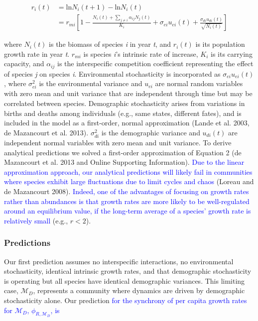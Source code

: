 \documentclass[12pt,]{article}
\begin{document}
\begin{align}
r_i(t) &= \text{ln}N_i(t+1) - \text{ln}N_i(t) \\
&= r_{mi} \left[ 1- \frac{N_i(t)+\sum_{j \neq i} \alpha_{ij}N_j(t)} {K_i} + \sigma_{ei}u_{ei}(t) + \frac{\sigma_{di}u_{di}(t)}{\sqrt{N_i(t)}} \right]
\end{align}

\noindent where \(N_i(t)\) is the biomass of species \emph{i} in year
\emph{t}, and \(r_i(t)\) is its population growth rate in year \emph{t}.
\(r_{mi}\) is species \emph{i}'s intrinsic rate of increase, \(K_i\) is
its carrying capacity, and \(\alpha_{ij}\) is the interspecific
competition coefficient representing the effect of species \emph{j} on
species \emph{i}. Environmental stochasticity is incorporated as
\(\sigma_{ei}u_{ei}(t)\), where \(\sigma_{ei}^2\) is the environmental
variance and \(u_{ei}\) are normal random variables with zero mean and
unit variance that are independent through time but may be correlated
between species. Demographic stochasticity arises from variations in
births and deaths among individuals (e.g., same states, different
fates), and is included in the model as a first-order, normal
approximation (Lande et al. 2003, {{de Mazancourt}} et al. 2013).
\(\sigma_{di}^2\) is the demographic variance and \(u_{di}(t)\) are
independent normal variables with zero mean and unit variance. To derive
analytical predictions we solved a first-order approximation of Equation
2 ({{de Mazancourt}} et al. 2013 and Online Supporting Information).
\textcolor{blue}{Due to the linear approximation approach, our analytical predictions will likely fail in communities where species exhibit large fluctuations due to limit cycles and chaos}
(Loreau and {{de Mazancourt}} 2008).
\textcolor{blue}{Indeed, one of the advantages of focusing on growth rates rather than abundances is that growth rates are more likely to be well-regulated around an equilibrium value, if the long-term average of a species' growth rate is relatively small}
(e.g., \(r < 2\)).

\subsubsection{Predictions}\label{predictions}

Our first prediction assumes no interspecific interactions, no
environmental stochasticity, identical intrinsic growth rates, and that
demographic stochasticity is operating but all species have identical
demographic variances. This limiting case, \(\mathcal{M}_{D}\),
represents a community where dynamics are driven by demographic
stochasticity alone. Our prediction
\textcolor{blue}{for the synchrony of per capita growth rates for $\mathcal{M}_{D}$, $\phi_{R,\mathcal{M}_{D}}$, is}
\end{document}
